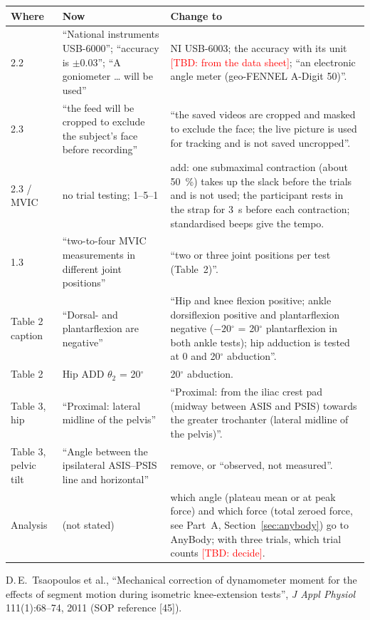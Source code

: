 \documentclass[a4paper,10pt]{article}
\newcommand{\dg}{\ensuremath{^\circ}}
\newcommand{\tbd}[1]{\textcolor{red}{[TBD: #1]}}
\begin{document}
\begin{longtable}{@{}P{2.2cm}P{6.0cm}P{7.8cm}@{}}
\toprule
Where & Now & Change to \\
\midrule
{} & ``National instruments USB-6000''; ``accuracy is $\pm$0.03''; ``A goniometer \dots{} will be used'' & NI USB-6003; the accuracy with
  its unit \tbd{from the data sheet}; ``an electronic angle meter (geo-FENNEL A-Digit 50)''. \\
2.3 & ``the feed will be cropped to exclude the subject's face before recording'' & ``the saved videos are cropped and masked to exclude
  the face; the live picture is used for tracking and is not saved uncropped''. \\
2.3 / MVIC & no trial testing; 1--5--1 & add: one submaximal contraction (about 50~\%) takes up the slack before the trials and is not
  used; the participant rests in the strap for 3~s before each contraction; standardised beeps give the tempo. \\
1.3 & ``two-to-four MVIC measurements in different joint positions'' & ``two or three joint positions per test (Table~2)''. \\
Table 2 caption & ``Dorsal- and plantarflexion are negative'' & ``Hip and knee flexion positive; ankle dorsiflexion positive and
  plantarflexion negative ($-20$\dg{} = 20\dg{} plantarflexion in both ankle tests); hip adduction is tested at 0 and 20\dg{} abduction''. \\
Table 2 & Hip ADD $\theta_2$ = 20\dg & 20\dg{} abduction. \\
Table 3, hip & ``Proximal: lateral midline of the pelvis'' & ``Proximal: from the iliac crest pad (midway between ASIS and PSIS) towards
  the greater trochanter (lateral midline of the pelvis)''. \\
Table 3, pelvic tilt & ``Angle between the ipsilateral ASIS--PSIS line and horizontal'' & remove, or ``observed, not measured''. \\
Analysis & (not stated) & which angle (plateau mean or at peak force) and which force (total zeroed force, see Part~A,
  Section~\ref{sec:anybody}) go to AnyBody; with three trials, which trial counts \tbd{decide}. \\
\bottomrule
\end{longtable}

\begin{thebibliography}{9}
 D.\,E.\ Tsaopoulos et al., ``Mechanical correction of dynamometer moment for the effects of segment motion during
  isometric knee-extension tests'', \emph{J Appl Physiol} 111(1):68--74, 2011 (SOP reference [45]).
\end{thebibliography}
\end{document}

